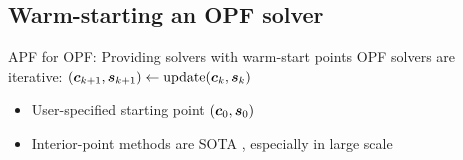 \subsection{Warm-starting an OPF solver}

\begin{frame}[t]{APF for OPF: Providing solvers with warm-start points}{}
    OPF solvers are iterative:
    \textcolor<1>{CornellRed}{\(\OPFVars[k+1] \gets \operatorname{update}\!\OPFVars[k]\)}
    \begin{itemize}
        \item User-specified \textcolor<1>{CornellRed}{starting point \(\OPFVars[0]\)}
        \item \textcolor<1>{CornellRed}{Interior-point methods} are SOTA \cite{Capitanescu+2007},
            especially in large scale \cite{CapitanescuWehenkel2013,Kardos+2020v4,Kardos+2022}
    \end{itemize}


\end{frame}

